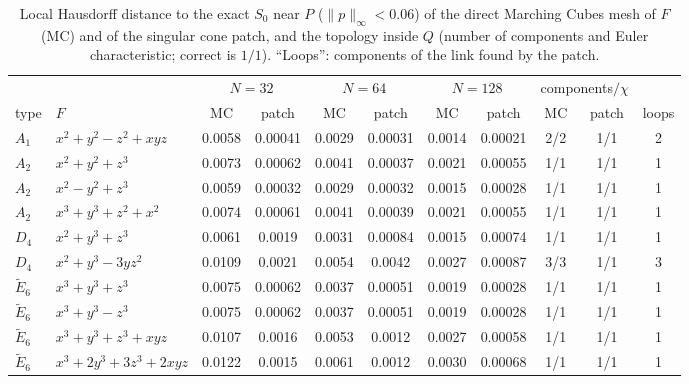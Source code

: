 \documentclass[12pt, a4paper]{article}
\theoremstyle{plain}
\theoremstyle{definition}
\theoremstyle{remark}
\theoremstyle{definition}
\begin{document}
\begin{table}[!ht]
\centering
\small
\begin{adjustbox}{max width=\textwidth}
\begin{tabular}{l l c c c c c c c c c}
\toprule
& & \multicolumn{2}{c}{$N=32$} & \multicolumn{2}{c}{$N=64$} & \multicolumn{2}{c}{$N=128$} & \multicolumn{2}{c}{components$/\chi$} & \\
\cmidrule(lr){3-4}\cmidrule(lr){5-6}\cmidrule(lr){7-8}\cmidrule(lr){9-10}
type & $F$ & MC & patch & MC & patch & MC & patch & MC & patch & loops \\
\midrule
$A_1$ & $x^2+y^2-z^2+xyz$ & 0.0058 & 0.00041 & 0.0029 & 0.00031 & 0.0014 & 0.00021 & 2/2 & 1/1 & 2 \\
$A_2$ & $x^2+y^2+z^3$ & 0.0073 & 0.00062 & 0.0041 & 0.00037 & 0.0021 & 0.00055 & 1/1 & 1/1 & 1 \\
$A_2$ & $x^2-y^2+z^3$ & 0.0059 & 0.00032 & 0.0029 & 0.00032 & 0.0015 & 0.00028 & 1/1 & 1/1 & 1 \\
$A_2$ & $x^3+y^3+z^2+x^2$ & 0.0074 & 0.00061 & 0.0041 & 0.00039 & 0.0021 & 0.00055 & 1/1 & 1/1 & 1 \\
$D_4$ & $x^2+y^3+z^3$ & 0.0061 & 0.0019 & 0.0031 & 0.00084 & 0.0015 & 0.00074 & 1/1 & 1/1 & 1 \\
$D_4$ & $x^2+y^3-3yz^2$ & 0.0109 & 0.0021 & 0.0054 & 0.0042 & 0.0027 & 0.00087 & 3/3 & 1/1 & 3 \\
$\tilde E_6$ & $x^3+y^3+z^3$ & 0.0075 & 0.00062 & 0.0037 & 0.00051 & 0.0019 & 0.00028 & 1/1 & 1/1 & 1 \\
$\tilde E_6$ & $x^3+y^3-z^3$ & 0.0075 & 0.00062 & 0.0037 & 0.00051 & 0.0019 & 0.00028 & 1/1 & 1/1 & 1 \\
$\tilde E_6$ & $x^3+y^3+z^3+xyz$ & 0.0107 & 0.0016 & 0.0053 & 0.0012 & 0.0027 & 0.00058 & 1/1 & 1/1 & 1 \\
$\tilde E_6$ & $x^3+2y^3+3z^3+2xyz$ & 0.0122 & 0.0015 & 0.0061 & 0.0012 & 0.0030 & 0.00068 & 1/1 & 1/1 & 1 \\
\bottomrule
\end{tabular}
\end{adjustbox}
\caption[Cone patch against Marching Cubes]{Local Hausdorff distance to the exact
$S_0$ near $P$ ($\|p\|_\infty<0.06$) of the direct Marching Cubes mesh of $F$ (MC)
and of the singular cone patch, and the topology inside $Q$ (number of components and
Euler characteristic; correct is $1/1$). ``Loops'': components of the link found by
the patch.}
\label{tab:cone-vs-mc}
\end{table}
\end{document}
